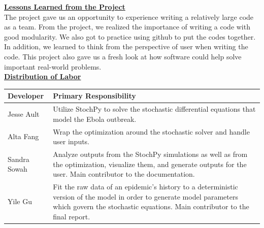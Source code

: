 \documentclass[11pt,letter]{article}
\begin{document}



\underline{\textbf{Lessons Learned from the Project}}\vspace{0.5mm}\\

The project gave us an opportunity to experience writing a relatively large code as a team. From the project, we realized the importance of writing a code with good modularity. We also got to practice using github to put the codes together. In addition, we learned to think from the perspective of user when writing the code. This project also gave us a fresh look at how software could help solve important real-world problems. \\


\underline{\textbf{Distribution of Labor}}\vspace{0.5mm}\\
\begin{center}
	\begin{tabular}{ l | p{13cm}}
           Developer & Primary Responsibility \\ \hline
	Jesse Ault & Utilize StochPy to solve the stochastic differential equations that model the Ebola outbreak. \\
	Alta Fang & Wrap the optimization around the stochastic solver and handle user inputs. \\
	Sandra Sowah & Analyze outputs from the StochPy simulations as well as from the optimization, visualize them, and generate outputs for the user. Main contributor to the documentation.\\
	Yile Gu & Fit the raw data of an epidemic's history to a deterministic version of the model in order to generate model parameters which govern the stochastic equations. Main contributor to the final report.
	\end{tabular}
\end{center}
\end{document}
